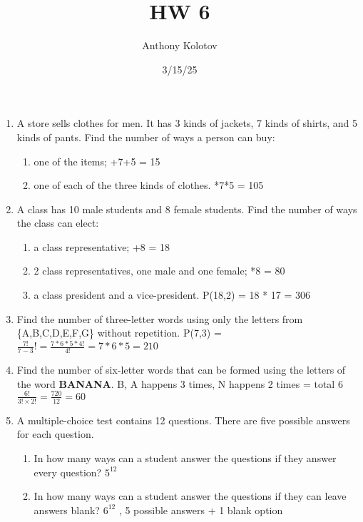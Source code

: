 \documentclass{article}
\title{ HW 6}
\date{3/15/25}
\author{Anthony Kolotov}
\begin{document}
	
	\maketitle
	
	
	\begin{enumerate}
		\item A store sells clothes for men. It has 3 kinds of jackets, 7 kinds of shirts, and 5 kinds of pants. Find the number of ways a person can buy:
		\begin{enumerate}
			\item one of the items;
			+7+5 = 15
			\item one of each of the three kinds of clothes.
			*7*5 = 105
		\end{enumerate}
		
		\item A class has 10 male students and 8 female students. Find the number of ways the class can elect:
		\begin{enumerate}
			\item a class representative;
			+8 = 18
			\item 2 class representatives, one male and one female;
			*8 = 80
			\item a class president and a vice-president.
			\subitem P(18,2) = 18 * 17 = 306
		\end{enumerate}
		
		\item Find the number of three-letter words using only the letters from \{A,B,C,D,E,F,G\} without repetition.
		\subitem P(7,3) = $\frac{7!}{7-3}! = \frac{7*6*5*4!}{4!} = 7*6*5 = 210$
		
		\item Find the number of six-letter words that can be formed using the letters of the word \textbf{BANANA}.
		\subitem B, A happens 3 times, N happens 2 times = total 6
		\subitem $\frac{6!}{3!\times2!} = \frac{720}{12} = 60 $ 
		\item A multiple-choice test contains 12 questions. There are five possible answers for each question.
		\begin{enumerate}
			\item In how many ways can a student answer the questions if they answer every question?
			\subitem $5^{12}$
			\item In how many ways can a student answer the questions if they can leave answers blank?
			\subitem $6^12$ , 5 possible answers + 1 blank option
			

\end{enumerate}
\end{enumerate}
\end{document}
